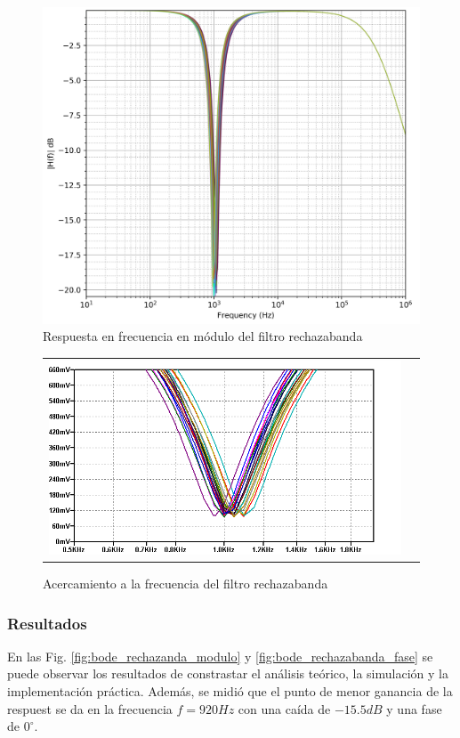 \begin{figure}[H]
    \centering
        \includegraphics[scale=0.12]{../EJ2/Recursos/br_montecarlo.png}
    \caption{Respuesta en frecuencia en m\'odulo del filtro rechazabanda}
    \label{fig:br_montecarlo}
\end{figure}

\begin{figure}[H]
    \centering
    \begin{tabular}{c c}
        \includegraphics[scale=0.6]{../EJ2/Recursos/br_montecarlo_frecuencia.png}
    \end{tabular}
    \caption{Acercamiento a la frecuencia del filtro rechazabanda}
    \label{fig:br_montecarlo_frecuencia}
\end{figure}

\subsubsection{Resultados}
En las Fig. \ref{fig:bode_rechazanda_modulo} y \ref{fig:bode_rechazabanda_fase} se puede observar los resultados de constrastar el an\'alisis te\'orico,
la simulaci\'on y la implementaci\'on pr\'actica. Adem\'as, se midi\'o que el punto de menor ganancia de la respuest se da en la frecuencia $f = 920Hz$ con una ca\'ida
de $-15.5dB$ y una fase de $0^{\circ}$.

